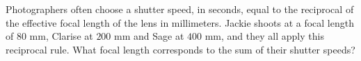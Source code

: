 Photographers often choose a shutter speed, in seconds, equal to the reciprocal of the effective focal length of the lens in millimeters. Jackie shoots at a focal length of $80$ mm, Clarise at $200$ mm and Sage at $400$ mm, and they all apply this reciprocal rule. What focal length corresponds to the sum of their shutter speeds?
